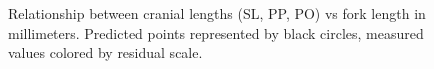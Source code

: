\documentclass[12pt]{article}\usepackage[]{graphicx}\usepackage[]{color}
\begin{document}
\begin{figure}[htb]

 \hfill{}

\caption{Relationship between cranial lengths (SL, PP, PO) vs fork length in millimeters. Predicted points represented by black circles, measured values colored by residual scale.}\label{fig:figure3}
\end{figure}
\end{document}
